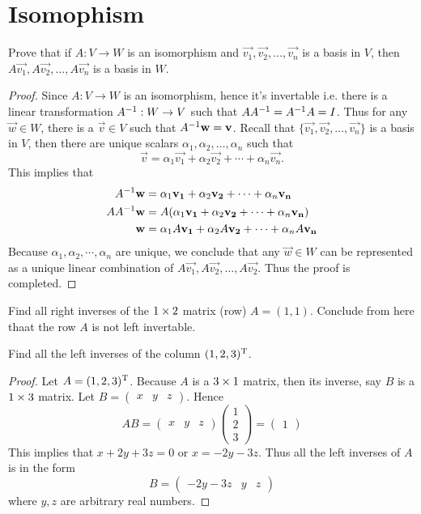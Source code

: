 \section{Isomophism}
\begin{exercise}
  Prove that if $A:V\to W$ is an isomorphism and
  $\vec{v_1},\vec{v_2},\dots,\vec{v_n}$ is a basis in $V$,
  then $A\vec{v_1},A\vec{v_2},\dots,A\vec{v_n}$ is a basis in
  $W$.
\end{exercise}
\begin{proof}
  Since $A:V\to W$ is an isomorphism, hence it's invertable i.e. 
  there is a linear transformation $A^{-1}:W\to V$ such that
  $AA^{-1}=A^{-1} A=I$. Thus for any $\vec{w}\in W$, there is a
  $\vec{v}\in V$ such that $A^{-1}\mathbf{w}=\mathbf{v}$. Recall that
  $\{\vec{v_1},\vec{v_2},\dots,\vec{v_n}\}$ is a basis in $V$, then
  there are unique scalars $\alpha_1,\alpha_2,\dots,\alpha_n$ such that
  \[\vec{v}=\alpha_1\vec{v_1}+\alpha_2\vec{v_2}+\cdots+\alpha_n\vec{v_n}.\]
  This implies that
  \begin{align*}
    A^{-1}\mathbf{w}&=\alpha_1\mathbf{v_1}+\alpha_2\mathbf{v_2}+\cdots+\alpha_n\mathbf{v_n}\\
    AA^{-1}\mathbf{w}&=A(\alpha_1\mathbf{v_1}+\alpha_2\mathbf{v_2}+\cdots+\alpha_n\mathbf{v_n})\\
    \mathbf{w}&=\alpha_1A\mathbf{v_1}+\alpha_2A\mathbf{v_2}+\cdots+\alpha_nA\mathbf{v_n}\\
  \end{align*}
  Because $\alpha_1,\alpha_2,\cdots,\alpha_n$ are unique, we conclude
  that any $\vec{w}\in W$ can be represented as a unique linear combination
  of $A\vec{v_1},A\vec{v_2},\dots,A\vec{v_2}$. Thus the proof is completed.
\end{proof}
\begin{exercise}
  Find all right inverses of the $1\times 2$ matrix (row) $A=(1,1)$.
  Conclude from here thaat the row $A$ is not left invertable.
\end{exercise}
\begin{exercise}
  Find all the left inverses of the column $(1,2,3)^\mathrm{T}$.
\end{exercise}
\begin{proof}
  Let $A=(1,2,3)^\mathrm{T}$. Because $A$ is a $3\times 1$ matrix, then its
  inverse, say $B$ is a $1\times 3$ matrix. Let 
  $B= \begin{pmatrix} x&y&z \end{pmatrix} $. Hence
  \[AB=
    \begin{pmatrix}
      x&y&z
    \end{pmatrix}
    \begin{pmatrix}
      1\\2\\3
    \end{pmatrix}=
    \begin{pmatrix}
      1
    \end{pmatrix}
  \]
  This implies that $x+2y+3z=0$ or $x=-2y-3z$. Thus all the left
  inverses of $A$ is in the form
  \[B=
    \begin{pmatrix}
      -2y-3z & y&z
    \end{pmatrix}
  \]
  where $y,z$ are arbitrary real numbers.
\end{proof}
